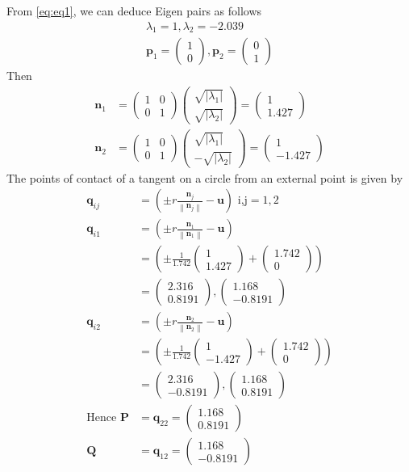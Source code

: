 \documentclass[12pt]{article}
\providecommand{\brak}[1]{\ensuremath{\left(#1\right)}}
\providecommand{\norm}[1]{\left\lVert#1\right\rVert}
\providecommand{\abs}[1]{\left\vert#1\right\vert}
\newcommand{\myvec}[1]{\ensuremath{\begin{pmatrix}#1\end{pmatrix}}}
\let\vec\mathbf
\begin{document}
From \eqref{eq:eq1}, we can deduce Eigen pairs as follows
\begin{align}
	\lambda_1 = 1, \lambda_2 = -2.039\\
	\vec{p}_1 = \myvec{1\\0}, \vec{p}_2=\myvec{0\\1}
\end{align}
Then
\begin{align}
	\vec{n}_1 &= \myvec{1&0\\0&1}\myvec{\sqrt{\abs{\lambda_1}}\\\sqrt{\abs{\lambda_2}}} = \myvec{1\\1.427}\\
	\vec{n}_2 &= \myvec{1&0\\0&1}\myvec{\sqrt{\abs{\lambda_1}}\\-\sqrt{\abs{\lambda_2}}} = \myvec{1\\-1.427}
\end{align}
The points of contact of a tangent on a circle from an external point is given by
\begin{align}
	\vec{q}_{ij} &= \brak{\pm r\frac{\vec{n}_j}{\norm{\vec{n}_j}}-\vec{u}} \text{ i,j} = 1,2\\
	\vec{q}_{i1} &= \brak{\pm r\frac{\vec{n}_1}{\norm{\vec{n}_1}}-\vec{u}}\\
	             &= \brak{\pm\frac{1}{1.742}\myvec{1\\1.427}+\myvec{1.742\\0}}\\
		     &= \myvec{2.316\\0.8191},\myvec{1.168\\-0.8191}\\ 		     
	\vec{q}_{i2} &= \brak{\pm r\frac{\vec{n}_2}{\norm{\vec{n}_2}}-\vec{u}}\\
	             &= \brak{\pm\frac{1}{1.742}\myvec{1\\-1.427}+\myvec{1.742\\0}}\\
		     &= \myvec{2.316\\-0.8191},\myvec{1.168\\0.8191}\\
	\text{Hence } \vec{P} &= \vec{q}_{22} = \myvec{1.168\\0.8191}\\
	\vec{Q} &= \vec{q}_{12} = \myvec{1.168\\-0.8191}		
\end{align}
\end{document}
